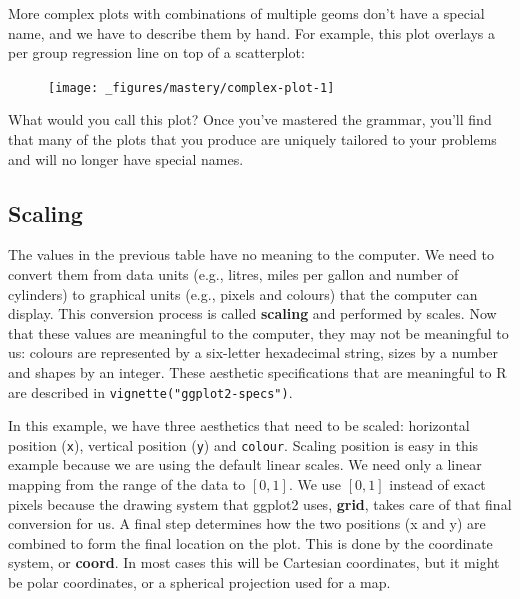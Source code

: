 More complex plots with combinations of multiple geoms don't have a
special name, and we have to describe them by hand. For example, this
plot overlays a per group regression line on top of a scatterplot:

\begin{Shaded}
\begin{Highlighting}[]
 \StringTok{ }
\StringTok{  }\NormalTok{() +}\StringTok{ }
\StringTok{  }\NormalTok{(} \NormalTok{)}
\end{Highlighting}
\end{Shaded}

\begin{figure}[H]
  \centering
  \texttt{[image: \_figures/mastery/complex-plot-1]}
\end{figure}

What would you call this plot? Once you've mastered the grammar, you'll
find that many of the plots that you produce are uniquely tailored to
your problems and will no longer have special names. 

\subsection{Scaling}\label{scaling}

The values in the previous table have no meaning to the computer. We
need to convert them from data units (e.g., litres, miles per gallon and
number of cylinders) to graphical units (e.g., pixels and colours) that
the computer can display. This conversion process is called
\textbf{scaling} and performed by scales. Now that these values are
meaningful to the computer, they may not be meaningful to us: colours
are represented by a six-letter hexadecimal string, sizes by a number
and shapes by an integer. These aesthetic specifications that are
meaningful to R are described in \texttt{vignette("ggplot2-specs")}.

In this example, we have three aesthetics that need to be scaled:
horizontal position (\texttt{x}), vertical position (\texttt{y}) and
\texttt{colour}. Scaling position is easy in this example because we are
using the default linear scales. We need only a linear mapping from the
range of the data to \([0, 1]\). We use \([0, 1]\) instead of exact
pixels because the drawing system that ggplot2 uses, \textbf{grid},
takes care of that final conversion for us. A final step determines how
the two positions (x and y) are combined to form the final location on
the plot. This is done by the coordinate system, or \textbf{coord}. In
most cases this will be Cartesian coordinates, but it might be polar
coordinates, or a spherical projection used for a map.

